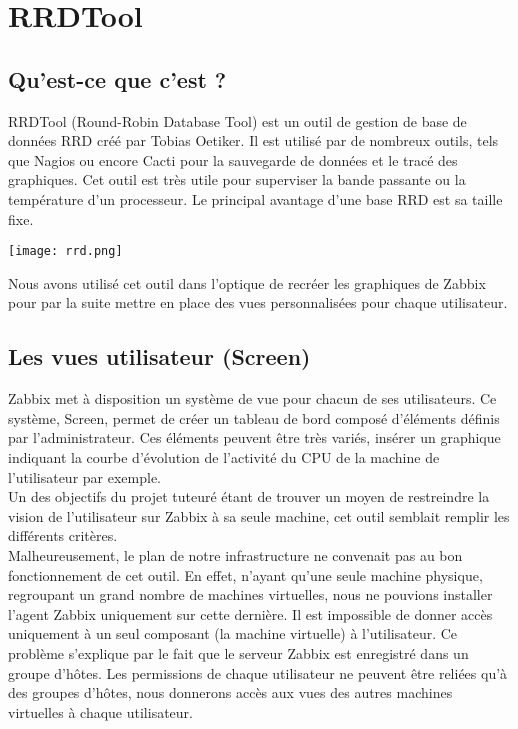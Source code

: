 \section{RRDTool}
	\subsection{Qu'est-ce que c'est ?}
		\vspace{0.3cm}

		RRDTool (Round-Robin Database Tool) est un outil de gestion de base de données RRD créé par Tobias Oetiker. Il est utilisé par de nombreux outils, tels que Nagios ou encore Cacti pour la sauvegarde de données et le tracé des graphiques. Cet outil est très utile pour superviser la bande passante ou la température d'un processeur. Le principal avantage d'une base RRD est sa taille fixe. \\

\begin{center}

		\texttt{[image: rrd.png]}

		\vspace{0.3cm}

\end{center}

		Nous avons utilisé cet outil dans l'optique de recréer les graphiques de Zabbix pour par la suite mettre en place des vues personnalisées pour chaque utilisateur.\\

	\subsection{Les vues utilisateur (Screen)}
		\vspace{0.3cm}

		Zabbix met à disposition un système de vue pour chacun de ses utilisateurs. Ce système, Screen, permet de créer un tableau de bord composé d'éléments définis par l'administrateur. Ces éléments peuvent être très variés, insérer un graphique indiquant la courbe d'évolution de l'activité du CPU de la machine de l'utilisateur par exemple.\\

		Un des objectifs du projet tuteuré étant de trouver un moyen de restreindre la vision de l'utilisateur sur Zabbix à sa seule machine, cet outil semblait remplir les différents critères.\\

		Malheureusement, le plan de notre infrastructure ne convenait pas au bon fonctionnement de cet outil. En effet, n'ayant qu'une seule machine physique, regroupant un grand nombre de machines virtuelles, nous ne pouvions installer l'agent Zabbix uniquement sur cette dernière. Il est impossible de donner accès uniquement à un seul composant (la machine virtuelle) à l'utilisateur. Ce problème s'explique par le fait que le serveur Zabbix est enregistré dans un groupe d'hôtes. Les permissions de chaque utilisateur ne peuvent être reliées qu'à des groupes d'hôtes, nous donnerons accès aux vues des autres machines virtuelles à chaque utilisateur.\\

